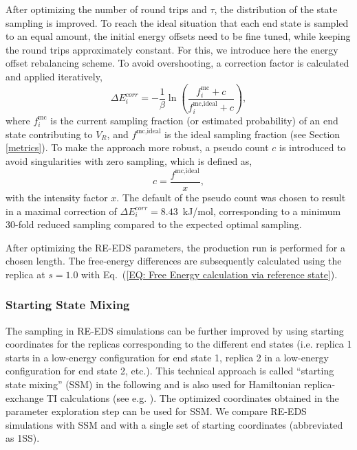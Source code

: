 After optimizing the number of round trips and $\tau$, the distribution of the state sampling is improved. To reach the ideal situation that each end state is sampled to an equal amount, the initial energy offsets need to be fine tuned, while keeping the round trips approximately constant. For this, we introduce here the energy offset rebalancing scheme.
To avoid overshooting, a correction factor is calculated and applied iteratively,
\begin{equation}
    \Delta E^{corr}_i = - \frac{1}{\beta} \ln \left( \frac{f_i^{\text{mc}}+c}{f^{\text{mc,ideal}}_{i}+c} \right),
    \label{eq: EoffRebalancing}
\end{equation}
where $f_i^{\text{mc}}$ is the current sampling fraction (or estimated probability) of an end state contributing to $V_R $, and $f^{\text{mc,ideal}}$ is the ideal sampling fraction (see Section \ref{metrics}). 
%
To make the approach more robust, a pseudo count $c$ is introduced to avoid singularities with zero sampling, which is defined as,
\begin{equation}
    c = \frac{f^{\text{mc,ideal}}}{x},
    \label{eq: EoffRebalancingPseudoCount}
\end{equation}
with the intensity factor $x$.
The default of the pseudo count was chosen to result in a maximal correction of $\Delta E^{corr}_i=8.43$~kJ/mol, corresponding to a minimum 30-fold reduced sampling compared to the expected optimal sampling.

After optimizing the RE-EDS parameters, the production run is performed for a chosen length. 
The free-energy differences are subsequently calculated using the replica at $s=1.0$ with Eq.~(\ref{EQ: Free Energy calculation via reference state}).

\subsubsection{Starting State Mixing}
The sampling in RE-EDS simulations can be further improved by using starting coordinates for the replicas corresponding to the different end states (i.e. replica 1 starts in a low-energy configuration for end state 1, replica 2 in a low-energy configuration for end state 2, etc.). This technical approach is called ``starting state mixing'' (SSM) in the following and is also used for Hamiltonian replica-exchange TI calculations (see e.g. ). The optimized coordinates obtained in the parameter exploration step can be used for SSM. We compare RE-EDS simulations with SSM and with a single set of starting coordinates (abbreviated as 1SS).  

